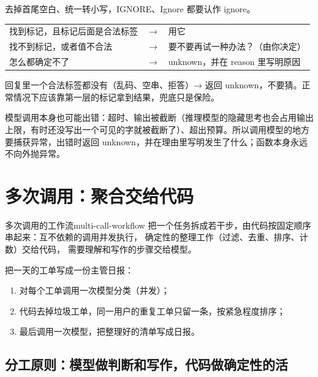 去掉首尾空白、统一转小写，IGNORE、Ignore 都要认作 ignore。

\begin{tcolorbox}[enhanced, sharp corners, boxrule=0pt, frame hidden,
                  borderline west={3pt}{0pt}{structurecolor},
                  colback=structurecolor!5]
    \begin{tabular}{@{}l@{\quad}c@{\quad}l@{}}
        找到标记，且标记后面是合法标签 & $\to$ & 用它 \\
        找不到标记，或者值不合法       & $\to$ & 要不要再试一种办法？（由你决定） \\
        怎么都确定不了                 & $\to$ & unknown，并在 reason 里写明原因
    \end{tabular}
\end{tcolorbox}
回复里一个合法标签都没有（乱码、空串、拒答）→ 返回 unknown，不要猜。正常情况下应该靠第一层的标记拿到结果，兜底只是保险。

模型调用本身也可能出错：超时、输出被截断（推理模型的隐藏思考也会占用输出上限，有时还没写出一个可见的字就被截断了）、超出预算。所以调用模型的地方要捕获异常，出错时返回 unknown，并在理由里写明发生了什么；函数本身永远不向外抛异常。

\section{多次调用：聚合交给代码}
\begin{definition}{多次调用的工作流}{multi-call-workflow}
把一个任务拆成若干步，由代码按固定顺序串起来：互不依赖的调用并发执行，
确定性的整理工作（过滤、去重、排序、计数）交给代码，
需要理解和写作的步骤交给模型。
\end{definition}

\begin{example}[（客服工单日报）]
把一天的工单写成一份主管日报：
\begin{enumerate}
  \item 对每个工单调用一次模型分类（并发）；
  \item 代码去掉垃圾工单，同一用户的重复工单只留一条，按紧急程度排序；
  \item 最后调用一次模型，把整理好的清单写成日报。
\end{enumerate}
\end{example}

\subsection{分工原则：模型做判断和写作，代码做确定性的活}

